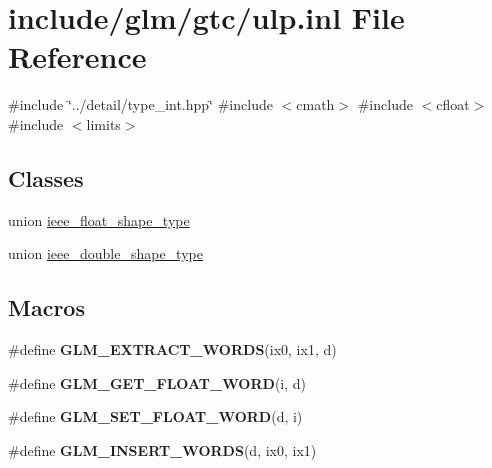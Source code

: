 \hypertarget{ulp_8inl}{}\section{include/glm/gtc/ulp.inl File Reference}
\label{ulp_8inl}
{\ttfamily \#include \char`\"{}../detail/type\+\_\+int.\+hpp\char`\"{}}\newline
{\ttfamily \#include $<$cmath$>$}\newline
{\ttfamily \#include $<$cfloat$>$}\newline
{\ttfamily \#include $<$limits$>$}\newline
\subsection*{Classes}
\begin{DoxyCompactItemize}
\item 
union \hyperlink{unionieee__float__shape__type}{ieee\+\_\+float\+\_\+shape\+\_\+type}
\item 
union \hyperlink{unionieee__double__shape__type}{ieee\+\_\+double\+\_\+shape\+\_\+type}
\end{DoxyCompactItemize}
\subsection*{Macros}
\begin{DoxyCompactItemize}
\item 
\#define {\bfseries G\+L\+M\+\_\+\+E\+X\+T\+R\+A\+C\+T\+\_\+\+W\+O\+R\+DS}(ix0,  ix1,  d)
\item 
\#define {\bfseries G\+L\+M\+\_\+\+G\+E\+T\+\_\+\+F\+L\+O\+A\+T\+\_\+\+W\+O\+RD}(i,  d)
\item 
\#define {\bfseries G\+L\+M\+\_\+\+S\+E\+T\+\_\+\+F\+L\+O\+A\+T\+\_\+\+W\+O\+RD}(d,  i)
\item 
\#define {\bfseries G\+L\+M\+\_\+\+I\+N\+S\+E\+R\+T\+\_\+\+W\+O\+R\+DS}(d,  ix0,  ix1)
\end{DoxyCompactItemize}

